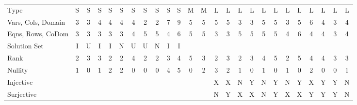 \begin{center}
\begin{tabular}{l*{24}{|c}}
&
&
&
&
&
&
&
&
&
&
&
&
&
&
&
&
&
&
&
&
&
&
&
&\\
 \hline
 Type                 &S  &S  &S  &S  &S  &S   &S  &S  &S  &S  &M  &M  &L  &L  &L  &L  &L  &L  &L  &L  &L  &L  &L  &L \\
 Vars, Cols, Domain   &3  &3  &4  &4  &4  &4   &2  &2  &7  &9  &5  &5  &5  &5  &3  &3  &5  &5  &3  &5  &6  &4  &3  &4 \\
 Eqns, Rows, CoDom    &3  &3  &3  &3  &3  &4   &5  &5  &4  &6  &5  &5  &3  &3  &5  &5  &5  &5  &4  &6  &4  &4  &3  &4 \\
 Solution Set         &I  &U  &I  &I  &N  &U   &U  &N  &I  &I  &   &   &   &   &   &   &   &   &   &   &   &   &   &  \\
 Rank                 &2  &3  &3  &2  &2  &4   &2  &2  &3  &4  &5  &3  &2  &3  &2  &3  &4  &5  &2  &5  &4  &4  &3  &3 \\
 Nullity              &1  &0  &1  &2  &2  &0   &0  &0  &4  &5  &0  &2  &3  &2  &1  &0  &1  &0  &1  &0  &2  &0  &0  &1 \\
 Injective            &   &   &   &   &   &    &   &   &   &   &   &   &X  &X  &N  &Y  &N  &Y  &N  &Y  &X  &Y  &Y  &N \\
 Surjective           &   &   &   &   &   &    &   &   &   &   &   &   &N  &Y  &X  &X  &N  &Y  &X  &X  &Y  &Y  &Y  &N \\

\end{tabular}
\end{center}
